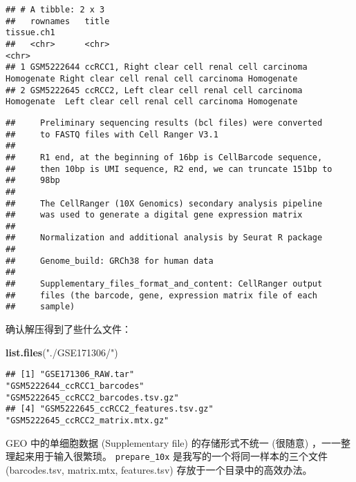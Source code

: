 \documentclass[
]{article}
\newenvironment{Shaded}{\begin{snugshade}}{\end{snugshade}}
\newcommand{\KeywordTok}[1]{\textcolor[rgb]{0.13,0.29,0.53}{\textbf{#1}}}
\newcommand{\NormalTok}[1]{#1}
\newcommand{\OperatorTok}[1]{\textcolor[rgb]{0.81,0.36,0.00}{\textbf{#1}}}
\newcommand{\StringTok}[1]{\textcolor[rgb]{0.31,0.60,0.02}{#1}}
\begin{document}
\begin{verbatim}
## # A tibble: 2 x 3
##   rownames   title                                                    tissue.ch1                                      
##   <chr>      <chr>                                                    <chr>                                           
## 1 GSM5222644 ccRCC1, Right clear cell renal cell carcinoma Homogenate Right clear cell renal cell carcinoma Homogenate
## 2 GSM5222645 ccRCC2, Left clear cell renal cell carcinoma Homogenate  Left clear cell renal cell carcinoma Homogenate
\end{verbatim}

\begin{Shaded}
\end{Shaded}

\begin{verbatim}
##     Preliminary sequencing results (bcl files) were converted
##     to FASTQ files with Cell Ranger V3.1
## 
##     R1 end, at the beginning of 16bp is CellBarcode sequence,
##     then 10bp is UMI sequence, R2 end, we can truncate 151bp to
##     98bp
## 
##     The CellRanger (10X Genomics) secondary analysis pipeline
##     was used to generate a digital gene expression matrix
## 
##     Normalization and additional analysis by Seurat R package
## 
##     Genome_build: GRCh38 for human data
## 
##     Supplementary_files_format_and_content: CellRanger output
##     files (the barcode, gene, expression matrix file of each
##     sample)
\end{verbatim}

确认解压得到了些什么文件：

\begin{Shaded}
\begin{Highlighting}[]
\KeywordTok{list.files}\NormalTok{(}\StringTok{"./GSE171306/"}\NormalTok{)}
\end{Highlighting}
\end{Shaded}

\begin{verbatim}
## [1] "GSE171306_RAW.tar"                 "GSM5222644_ccRCC1_barcodes"        "GSM5222645_ccRCC2_barcodes.tsv.gz"
## [4] "GSM5222645_ccRCC2_features.tsv.gz" "GSM5222645_ccRCC2_matrix.mtx.gz"
\end{verbatim}

GEO 中的单细胞数据 (Supplementary file) 的存储形式不统一 (很随意) ，一一整理起来用于输入很繁琐。
\texttt{prepare\_10x} 是我写的一个将同一样本的三个文件 (barcodes.tsv, matrix.mtx, features.tsv) 存放于一个目录中的高效办法。
\end{document}
